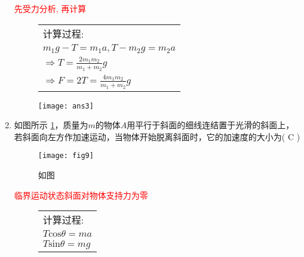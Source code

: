 \begin{enumerate}
\begin{note}
    \textcolor{red}{先受力分析, 再计算}
    \begin{figure}[ht]
        \begin{minipage}[ht]{0.6\linewidth}
            \begin{table}[H]
                \begin{tabular}{l}
                   \qquad 计算过程:\\
                   \qquad \qquad $m_1g-T=m_1a, T-m_2g = m_2a$ \\
                    \qquad \qquad   $\Longrightarrow T = \frac{2m_1m_2}{m_1+m_2}g$ \\
                    \qquad \qquad $\Longrightarrow F = 2T =\frac{4m_1m_2}{m_1+m_2}g$\\ 
                \end{tabular}
            \end{table}  
        \end{minipage}
        \begin{minipage}[H]{0.3\linewidth}
            \texttt{[image: ans3]}
        \end{minipage}
    \end{figure}
\end{note}
\item 如图所示 \ref{Fig:9}，质量为$m$的物体$A$用平行于斜面的细线连结置于光滑的斜面上，若斜面向左方作加速运动，当物体开始脱离斜面时，它的加速度的大小为( C )
    \begin{figure}[H]
        \centering
        \texttt{[image: fig9]}
        \caption{如图}\label{Fig:9}
    \end{figure}
    \begin{note}
        \textcolor{red}{临界运动状态斜面对物体支持力为零}
        \begin{figure}[ht]
            \begin{minipage}[ht]{0.6\linewidth}
                \begin{table}[H]
                    \begin{tabular}{l}
                       \qquad 计算过程:\\
                       \qquad \qquad $T \mathrm{cos}\theta=ma$ \\
                       \qquad \qquad $T \mathrm{sin}\theta=mg$ \\
                    \end{tabular}

\end{table}
\end{minipage}
\end{figure}
\end{note}
\end{enumerate}
